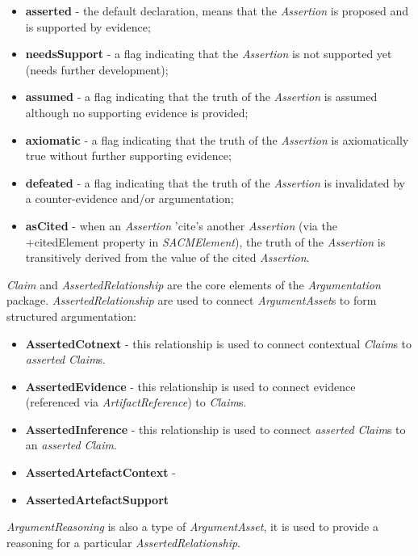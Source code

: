 \begin{itemize}
	\item \textbf{asserted} - the default declaration, means that the \textit{Assertion} is proposed and is supported by evidence;
	\item \textbf{needsSupport} - a flag indicating that the \textit{Assertion} is not supported yet (needs further development);
	\item \textbf{assumed} - a flag indicating that the truth of the \textit{Assertion} is assumed although no supporting evidence is provided;
	\item \textbf{axiomatic} - a flag indicating that the truth of the \textit{Assertion} is axiomatically true without further supporting evidence;
	\item \textbf{defeated} - a flag indicating that the truth of the \textit{Assertion} is invalidated by a counter-evidence and/or argumentation;
	\item \textbf{asCited} - when an \textit{Assertion} 'cite's another \textit{Assertion} (via the +citedElement property in \textit{SACMElement}), the truth of the \textit{Assertion} is transitively derived from the value of the cited \textit{Assertion}.
\end{itemize}

\textit{Claim} and \textit{AssertedRelationship} are the core elements of the \textit{Argumentation} package. \textit{AssertedRelationship} are used to connect \textit{ArgumentAsset}s to form structured argumentation:

\begin{itemize}
	\item \textbf{AssertedCotnext} - this relationship is used to connect contextual \textit{Claim}s to \textit{asserted} \textit{Claim}s. 
	\item \textbf{AssertedEvidence} - this relationship is used to connect evidence (referenced via \textit{ArtifactReference}) to \textit{Claim}s. 
	\item \textbf{AssertedInference} - this relationship is used to connect \textit{asserted} \textit{Claim}s to an \textit{asserted} \textit{Claim}.
	\item \textbf{AssertedArtefactContext} -
	\item \textbf{AssertedArtefactSupport}
\end{itemize}

\textit{ArgumentReasoning} is also a type of \textit{ArgumentAsset}, it is used to provide a reasoning for a particular \textit{AssertedRelationship}.

